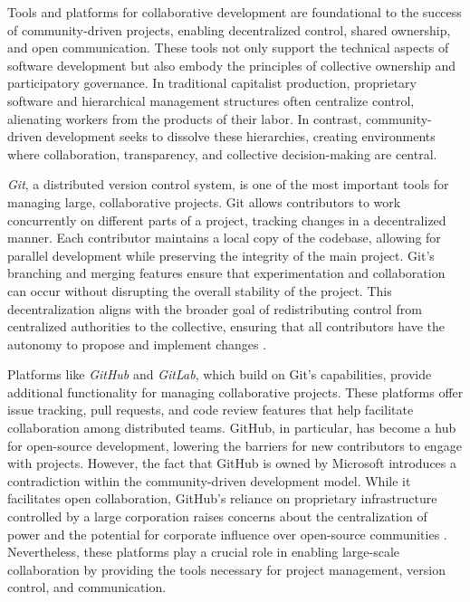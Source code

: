 \begin{refsection}
Tools and platforms for collaborative development are foundational to the success of community-driven projects, enabling decentralized control, shared ownership, and open communication. These tools not only support the technical aspects of software development but also embody the principles of collective ownership and participatory governance. In traditional capitalist production, proprietary software and hierarchical management structures often centralize control, alienating workers from the products of their labor. In contrast, community-driven development seeks to dissolve these hierarchies, creating environments where collaboration, transparency, and collective decision-making are central.

\textit{Git}, a distributed version control system, is one of the most important tools for managing large, collaborative projects. Git allows contributors to work concurrently on different parts of a project, tracking changes in a decentralized manner. Each contributor maintains a local copy of the codebase, allowing for parallel development while preserving the integrity of the main project. Git’s branching and merging features ensure that experimentation and collaboration can occur without disrupting the overall stability of the project. This decentralization aligns with the broader goal of redistributing control from centralized authorities to the collective, ensuring that all contributors have the autonomy to propose and implement changes \cite[pp.~150-153]{chacon2019}.

Platforms like \textit{GitHub} and \textit{GitLab}, which build on Git’s capabilities, provide additional functionality for managing collaborative projects. These platforms offer issue tracking, pull requests, and code review features that help facilitate collaboration among distributed teams. GitHub, in particular, has become a hub for open-source development, lowering the barriers for new contributors to engage with projects. However, the fact that GitHub is owned by Microsoft introduces a contradiction within the community-driven development model. While it facilitates open collaboration, GitHub’s reliance on proprietary infrastructure controlled by a large corporation raises concerns about the centralization of power and the potential for corporate influence over open-source communities \cite[pp.~83-87]{feller2018}. Nevertheless, these platforms play a crucial role in enabling large-scale collaboration by providing the tools necessary for project management, version control, and communication.


\end{refsection}

